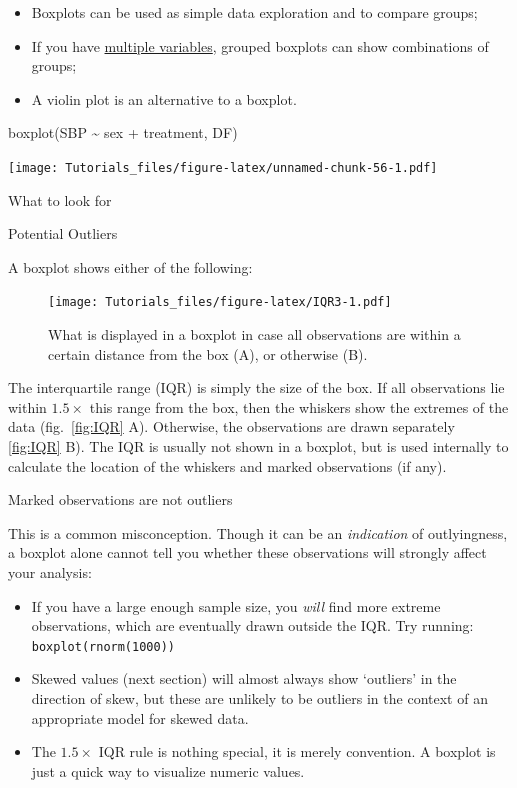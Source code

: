 \documentclass[
]{book}
\newenvironment{Shaded}{\begin{snugshade}}{\end{snugshade}}
\newcommand{\FunctionTok}[1]{\textcolor[rgb]{0.00,0.00,0.00}{#1}}
\newcommand{\NormalTok}[1]{#1}
\newcommand{\SpecialCharTok}[1]{\textcolor[rgb]{0.00,0.00,0.00}{#1}}
\providecommand{\tightlist}{%
  \setlength{\itemsep}{0pt}\setlength{\parskip}{0pt}}
\begin{document}
\begin{itemize}
\tightlist
\item
  Boxplots can be used as simple data exploration and to compare groups;
\item
  If you have \protect\hyperlink{tidy}{multiple variables}, grouped boxplots can show combinations of groups;
\item
  A violin plot is an alternative to a boxplot.
\end{itemize}

\begin{Shaded}
\begin{Highlighting}[]
\FunctionTok{boxplot}\NormalTok{(SBP }\SpecialCharTok{\textasciitilde{}}\NormalTok{ sex }\SpecialCharTok{+}\NormalTok{ treatment, DF)}
\end{Highlighting}
\end{Shaded}

\texttt{[image: Tutorials\_files/figure-latex/unnamed-chunk-56-1.pdf]}

What to look for

Potential Outliers

A boxplot shows either of the following:

\begin{figure}
\centering
\texttt{[image: Tutorials\_files/figure-latex/IQR3-1.pdf]}
\caption{\label{fig:IQR3}What is displayed in a boxplot in case all observations are within a certain distance from the box (A), or otherwise (B).}
\end{figure}

The interquartile range (IQR) is simply the size of the box. If all observations lie within \(1.5\times\) this range from the box, then the whiskers show the extremes of the data (fig.~\ref{fig:IQR} A). Otherwise, the observations are drawn separately \ref{fig:IQR} B). The IQR is usually not shown in a boxplot, but is used internally to calculate the location of the whiskers and marked observations (if any).

Marked observations are not outliers

This is a common misconception. Though it can be an \emph{indication} of outlyingness, a boxplot alone cannot tell you whether these observations will strongly affect your analysis:

\begin{itemize}
\tightlist
\item
  If you have a large enough sample size, you \emph{will} find more extreme observations, which are eventually drawn outside the IQR. Try running: \texttt{boxplot(rnorm(1000))}
\item
  Skewed values (next section) will almost always show `outliers' in the direction of skew, but these are unlikely to be outliers in the context of an appropriate model for skewed data.
\item
  The \(1.5\times\) IQR rule is nothing special, it is merely convention. A boxplot is just a quick way to visualize numeric values.
\end{itemize}
\end{document}
